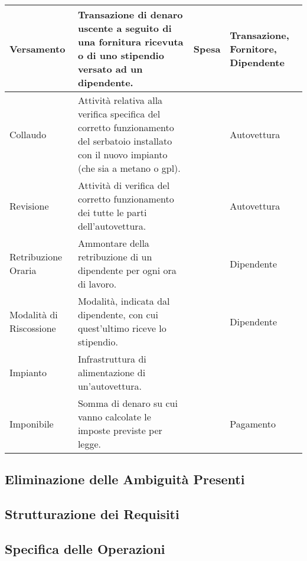 \begin{longtable}{| p{2.5cm} | p{4.5cm} | p{2cm} | p{2.5cm} |}
				Versamento &
				Transazione di denaro uscente a seguito di una fornitura ricevuta o di uno stipendio versato ad un dipendente. & 
				Spesa & 
				Transazione, Fornitore, Dipendente 
				\\ \hline
				Collaudo &
				Attività relativa alla verifica specifica del corretto funzionamento del serbatoio installato con il nuovo impianto (che sia a metano o gpl). &&
				Autovettura
				\\ \hline
				Revisione & 
				Attività di verifica del corretto funzionamento dei tutte le parti dell’autovettura. &&
				Autovettura
				\\ \hline
				Retribuzione Oraria & 
				Ammontare della retribuzione di un dipendente per ogni ora di lavoro. && 
				Dipendente
				\\ \hline
				Modalità di Riscossione &
				Modalità, indicata dal dipendente, con cui quest’ultimo riceve lo stipendio. &&
				Dipendente 
				\\ \hline
				Impianto & 
				Infrastruttura di alimentazione di un’autovettura.
				&&\\ \hline
				Imponibile &
				Somma di denaro su cui vanno calcolate le imposte previste per legge. &&
				Pagamento 
				\\ \hline
				
		\end{longtable}
		
	\subsection{Eliminazione delle Ambiguità Presenti}
	\subsection{Strutturazione dei Requisiti}
	\subsection{Specifica delle Operazioni}